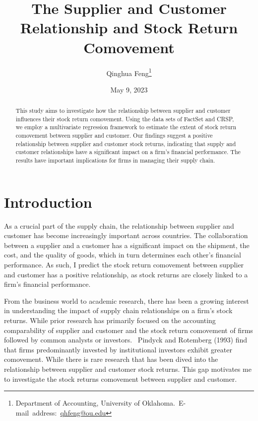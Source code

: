 \documentclass[12pt,english]{article}
\begin{document}
\begin{singlespace}
\title{The Supplier and Customer Relationship and
Stock Return Comovement}
\end{singlespace}

\author{Qinghua Feng\thanks{Department of Accounting, University of Oklahoma.\
E-mail~address:~\href{mailto:student.name@ou.edu}{qhfeng@ou.edu}}}

\date{May 9, 2023}

\maketitle

\begin{abstract}
\begin{singlespace}
This study aims to investigate how the relationship between supplier and customer influences their stock return comovement. Using the data sets of FactSet and CRSP, we employ a multivariate regression framework to estimate the extent of stock return comovement between supplier and customer. Our findings suggest a positive relationship between supplier and customer stock returns, indicating that supply and customer relationships have a significant impact on a firm's financial performance. The results have important implications for firms in managing their supply chain.
\end{singlespace}

\end{abstract}
\vfill{}


\pagebreak{}


\section{Introduction}\label{sec:intro}
As a crucial part of the supply chain, the relationship between supplier and customer has become increasingly important across countries. The collaboration between a supplier and a customer has a significant impact on the shipment, the cost, and the quality of goods, which in turn determines each other's financial performance. As such, I predict the stock return comovement between supplier and customer has a positive relationship, as stock returns are closely linked to a firm's financial performance.

From the business world to academic research, there has been a growing interest in understanding the impact of supply chain relationships on a firm's stock returns. While prior research has primarily focused on the accounting comparability of supplier and customer and the stock return comovement of firms followed by common analysts or investors.~\citep{pindyck1993comovement} Pindyck and Rotemberg (1993) find that firms predominantly invested by institutional investors exhibit greater comovement. While there is rare research that has been dived into the relationship between supplier and customer stock returns. This gap motivates me to investigate the stock returns comovement between supplier and customer.
\end{document}
